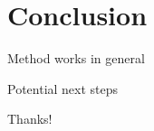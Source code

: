 \documentclass[aspectratio=169]{beamer}
\begin{document}
\section{Conclusion}
\begin{frame}{Method works in general}

\end{frame}

\begin{frame}{Potential next steps}
    
\end{frame}

\begin{frame}[standout]
    Thanks!
\end{frame}
\end{document}

